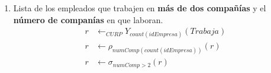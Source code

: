 \documentclass{article}
\begin{document}
\begin{enumerate}
{{\begin{enumerate}
{                        A los empleados que trabajan en \textbf{Ziffcorp} y que
                        ganen \textbf{\$18,000 mensuales} hacerles un
                        \textbf{decremento del 8\%}, mientras que a los que
                        trabajan en \textbf{Panaphonics} y que ganen 
                        \textbf{menos de \$12,000 mensuales} aumentarles su
                        sueldo en un \textbf{10\%}.
                         \begin{align*}
                         r & \leftarrow \sigma_{nombre = 'Ziffcorp' \wedge sueldo = 18 000 }(Trabaja \bowtie Empresa)\\
                         t & \leftarrow \pi_{CURP,idEmpresa,sueldo}(r)\\
                         r & \leftarrow \pi_{CURP,idEmpresa,sueldo*0.92}(r)\\
                         r & \leftarrow \rho_{sueldo(sueldo*0.92)}(r)\\
                         s & \leftarrow \sigma_{nombre = 'Panaphonics' \wedge sueldo < 12 000 }(Trabaja \bowtie Empresa)\\
                         w & \leftarrow \pi_{CURP,idEmpresa,sueldo}(s)\\
                         s & \leftarrow \pi_{CURP,idEmpresa,sueldo*1.1}(s)\\
                         s & \leftarrow \rho_{sueldo(sueldo*1.1)}(s)\\
                         Trabaja & \leftarrow Trabaja - t -w \\
                         Trabaja & \leftarrow Trabaja \cup r \cup s \\
                         \end{align*}
                    }
                    \item {
                        Lista de los empleados que trabajen en \textbf{más de
                        dos compañías} y el \textbf{número de companías} en que 
                        laboran.
                         \begin{align*}
                         r & \leftarrow _{CURP}Y_{count(idEmpresa)}(Trabaja)\\
                         r & \leftarrow \rho_{numComp(count(idEmpresa))}(r)\\
                         r & \leftarrow \sigma_{numComp > 2}(r)\\
                         \end{align*}
                    }

\end{enumerate}}}
\end{enumerate}
\end{document}
